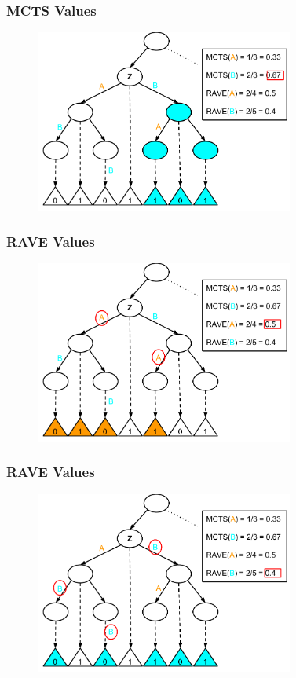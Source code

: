 \documentclass{beamer}
\begin{document}
\begin{frame}[fragile]
\frametitle{MCTS Values}
\begin{figure}[h]
	\includegraphics[width=8.5cm]{Diagrams/Rave/MCTSValueB.pdf}
	\centering
\end{figure}
\end{frame}

\begin{frame}[fragile]
\frametitle{RAVE Values}
\begin{figure}[h]
	\includegraphics[width=8.5cm]{Diagrams/Rave/RAVEValueA.pdf}
	\centering
\end{figure}
\end{frame}

\begin{frame}[fragile]
\frametitle{RAVE Values}
\begin{figure}[h]
	\includegraphics[width=8.5cm]{Diagrams/Rave/RAVEValueB.pdf}
	\centering
\end{figure}
\end{frame}
\end{document}
